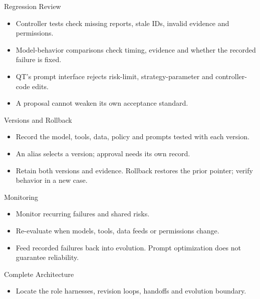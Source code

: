\begin{frame}{Regression Review}
\begin{itemize}
\item Controller tests check missing reports, stale IDs, invalid evidence and permissions.
\item Model-behavior comparisons check timing, evidence and whether the recorded failure is fixed.
\item QT's prompt interface rejects risk-limit, strategy-parameter and controller-code edits.
\item A proposal cannot weaken its own acceptance standard.
\end{itemize}
\end{frame}
\begin{frame}{Versions and Rollback}
\begin{center}
\resizebox{.94\textwidth}{!}{}
\end{center}
\begin{itemize}
\item Record the model, tools, data, policy and prompts tested with each version.
\item An alias selects a version; approval needs its own record.
\item Retain both versions and evidence. Rollback restores the prior pointer; verify behavior in a new case.
\end{itemize}
\end{frame}
\begin{frame}{Monitoring}
\begin{center}
\resizebox{.94\textwidth}{!}{}
\end{center}
\begin{itemize}
\item Monitor recurring failures and shared risks.
\item Re-evaluate when models, tools, data feeds or permissions change.
\item Feed recorded failures back into evolution. Prompt optimization does not guarantee reliability.
\end{itemize}
\end{frame}
\begin{frame}[t]{Complete Architecture}
\setlength{\topsep}{0pt}
\begin{center}\resizebox{!}{6.0cm}{}\end{center}
\begin{itemize}
\item Locate the role harnesses, revision loops, handoffs and evolution boundary.
\end{itemize}
\end{frame}
